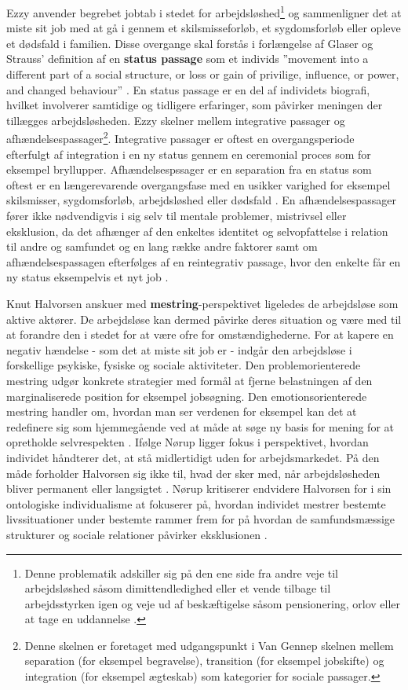 Ezzy anvender begrebet jobtab i stedet for arbejdsløshed\footnote{Denne problematik adskiller sig på den ene side fra andre veje til arbejdsløshed såsom dimittendledighed eller et vende tilbage til arbejdsstyrken igen og veje ud af beskæftigelse såsom pensionering, orlov eller at tage en uddannelse \parencite[48]{Ezzy1993}.} og sammenligner det at miste sit job med at gå i gennem et skilsmisseforløb, et sygdomsforløb eller opleve et dødsfald i familien. Disse overgange skal forstås i forlængelse af Glaser og Strauss' definition af en \textbf{status passage} som et individs ”movement into a different part of a social structure, or loss or gain of privilige, influence, or power, and changed behaviour” \parencite[48]{Ezzy1993}. En status passage er en del af individets biografi, hvilket involverer samtidige og tidligere erfaringer, som påvirker meningen der tillægges arbejdsløsheden. Ezzy skelner mellem integrative passager og afhændelsespassager\footnote{Denne skelnen er foretaget med udgangspunkt i Van Gennep skelnen mellem separation (for eksempel begravelse), transition (for eksempel jobskifte) og integration (for eksempel ægteskab) som kategorier for sociale passager\parencite[48]{Ezzy1993}.}. Integrative passager er oftest en overgangsperiode efterfulgt af integration i en ny status gennem en ceremonial proces som for eksempel bryllupper. Afhændelsespssager er en separation fra en status som oftest er en længerevarende overgangsfase med en usikker varighed for eksempel skilsmisser, sygdomsforløb, arbejdsløshed eller dødsfald \parencite[49]{Ezzy1993}. En afhændelsespassager fører ikke nødvendigvis i sig selv til mentale problemer, mistrivsel eller eksklusion, da det afhænger af den enkeltes identitet og selvopfattelse i relation til andre og samfundet og en lang række andre faktorer samt om afhændelsespassagen efterfølges af en reintegrativ passage, hvor den enkelte får en ny status eksempelvis et nyt job \parencite[32]{Noerup2014}.

Knut Halvorsen anskuer med \textbf{mestring}-perspektivet ligeledes de arbejdsløse som aktive aktører. De arbejdsløse kan dermed påvirke deres situation og være med til at forandre den i stedet for at være ofre for omstændighederne. For at kapere en negativ hændelse - som det at miste sit job er - indgår den arbejdsløse i forskellige psykiske, fysiske og sociale aktiviteter. Den problemorienterede mestring udgør konkrete strategier med formål at fjerne belastningen af den marginaliserede position for eksempel jobsøgning. Den emotionsorienterede mestring handler om, hvordan man ser verdenen for eksempel kan det at redefinere sig som hjemmegående ved at måde at søge ny basis for mening for at opretholde selvrespekten \parencite[47]{Halvorsen1999}. Ifølge Nørup ligger fokus i perspektivet, hvordan individet håndterer det, at stå midlertidigt uden for arbejdsmarkedet. På den måde forholder Halvorsen sig ikke til, hvad der sker med, når arbejdsløsheden bliver permanent eller langsigtet \parencite[30]{Noerup2014}. Nørup kritiserer endvidere Halvorsen for i sin ontologiske individualisme at fokuserer på, hvordan individet mestrer bestemte livssituationer under bestemte rammer frem for på hvordan de samfundsmæssige strukturer og sociale relationer påvirker eksklusionen \parencite[37]{Noerup2014}.


